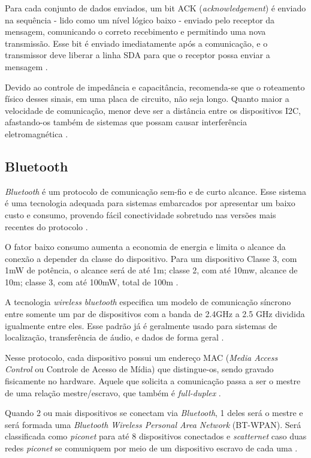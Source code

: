 Para cada conjunto de dados enviados, um bit ACK (\textit{acknowledgement}) é enviado na sequência - lido como um nível lógico baixo - enviado pelo receptor da mensagem, comunicando o correto recebimento e permitindo uma nova transmissão. Esse bit é enviado imediatamente após a comunicação, e o transmissor deve liberar a linha SDA para que o receptor possa enviar a mensagem \cite{man:texasI2C}. 

Devido ao controle de impedância e capacitância, recomenda-se que o roteamento físico desses sinais, em uma placa de circuito, não seja longo. Quanto maior a velocidade de comunicação, menor deve ser a distância entre os dispositivos I2C, afastando-os também de sistemas que possam causar interferência eletromagnética \cite{site:altiumpcb}.

\subsection{Bluetooth}

\textit{Bluetooth} é um protocolo de comunicação sem-fio e de curto alcance. Esse sistema é uma tecnologia adequada para sistemas embarcados por apresentar um baixo custo e consumo, provendo fácil conectividade sobretudo nas versões mais recentes do protocolo \cite{diss:ClaudioBluetooth}. 

O fator baixo consumo aumenta a economia de energia e limita o alcance da conexão a depender da classe do dispositivo. Para um dispositivo Classe 3, com 1mW de potência, o alcance será de até 1m; classe 2, com até 10mw, alcance de 10m; classe 3, com até 100mW, total de 100m \cite{tcc:tier2019}.

A tecnologia \textit{wireless} \textit{bluetooth} especifica um modelo de comunicação síncrono entre somente um par de dispositivos com a banda de 2.4GHz a 2.5 GHz dividida igualmente entre eles. Esse padrão já é geralmente usado para sistemas de localização, transferência de áudio, e dados de forma geral \cite{book:BluetoothDemystified}.

Nesse protocolo, cada dispositivo possui um endereço MAC (\textit{Media Access Control} ou Controle de Acesso de Mídia) que distingue-os, sendo gravado fisicamente no hardware. Aquele que solicita a comunicação passa a ser o mestre de uma relação mestre/escravo, que também é \textit{full-duplex} \cite{diss:ClaudioBluetooth}. 

Quando 2 ou mais dispositivos se conectam via \textit{Bluetooth}, 1 deles será o mestre e será formada uma \textit{Bluetooth Wireless Personal Area Network} (BT-WPAN). Será classificada como \textit{piconet} para até 8 dispositivos conectados e \textit{scatternet} caso duas redes \textit{piconet} se comuniquem por meio de um dispositivo escravo de cada uma \cite{tcc:tier2019}. 

